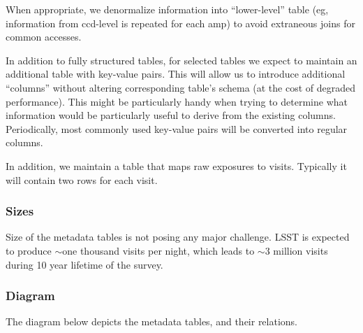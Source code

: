 \documentclass[DM,lsstdraft,toc]{lsstdoc}
\begin{document}
When appropriate, we denormalize information into ``lower-level'' table (eg, information from ccd-level is repeated for each amp) to avoid extraneous joins for common accesses.

In addition to fully structured tables, for selected tables we expect to maintain an additional table with key-value pairs. This will allow us to introduce additional ``columns'' without altering corresponding table's schema (at the cost of degraded performance). This might be particularly handy when trying to determine what information would be particularly useful to derive from the existing columns. Periodically, most commonly used key-value pairs will be converted into regular columns.

In addition, we maintain a table that maps raw exposures to visits. Typically it will contain two rows for each visit.

\subsubsection{Sizes}

Size of the metadata tables is not posing any major challenge. LSST is expected to produce $\sim$one thousand visits per night, which leads to $\sim$3 million visits during 10 year lifetime of the survey.

\subsubsection{Diagram}

The diagram below depicts the metadata tables, and their relations.
\end{document}
